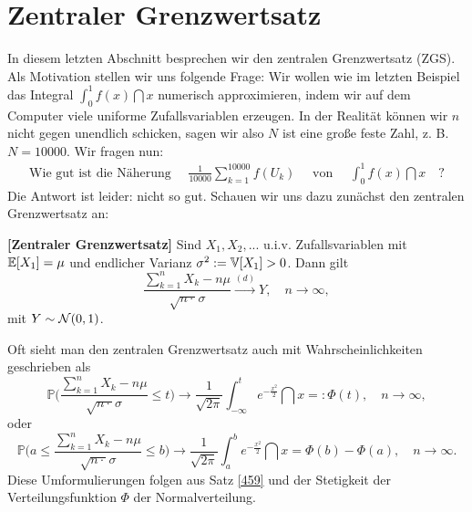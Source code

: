 \section{Zentraler Grenzwertsatz}
In diesem letzten Abschnitt besprechen wir den zentralen Grenzwertsatz (ZGS). Als Motivation stellen wir uns folgende Frage: Wir wollen wie im letzten Beispiel das Integral $\int_0^1 f(x)\dint x$ numerisch approximieren, indem wir auf dem Computer viele uniforme Zufallsvariablen erzeugen. In der Realit\"at k\"onnen wir $n$ nicht gegen unendlich schicken, sagen wir also $N$ ist eine gro\ss e feste Zahl, z. B. $N=10000$. Wir fragen nun:
\begin{align*}
	\text{Wie gut ist die N\"aherung $\quad \frac{1}{10000} \sum_{k=1}^{10000} f(U_k)\quad$ von $\quad\int_0^1 f(x)\dint x\quad$?} 
\end{align*}	
	Die Antwort ist leider: nicht so gut.  Schauen wir uns dazu zun\"achst den zentralen Grenzwertsatz an:
\begin{satz}\label{ZGS}
 \textbf{[Zentraler Grenzwertsatz]}
	Sind $X_1,X_2,...$ u.i.v. Zufallsvariablen mit $\mathbb{E}[X_1] = \mu$ und endlicher Varianz $\sigma^2:=\mathbb{V}[X_1]  > 0$. Dann gilt
		\label{ZGSEins} \[ \frac{\sum_{k = 1}^{n} X_k - n \mu}{\sqrt{n \cdot }\sigma} \overset{(d)}{\longrightarrow} Y, \quad n \to \infty, \]
		mit $Y \sim \mathcal{N}(0,1)$.
\end{satz}
Oft sieht man den zentralen Grenzwertsatz auch mit Wahrscheinlichkeiten geschrieben als
	 	 \[ \mathbb{P}\Big( \frac{\sum_{k=1}^{n}X_k - n \mu}{\sqrt{n \cdot }\sigma} \leq t\Big) \to \frac{1}{\sqrt{2 \pi}} \int_{-\infty}^{t} e^{-\frac{x^2}{2}} \dint x=: \Phi(t) ,\quad  n \to \infty,\]
oder
	 \[ \mathbb{P}\Big( a \leq \frac{\sum_{k=1}^{n}X_k - n \mu}{\sqrt{n \cdot }\sigma} \leq b \Big) \to \frac{1}{\sqrt{2 \pi}} \int_{a}^{b} e^{-\frac{x^2}{2}} \dint x=\Phi(b)-\Phi(a),\quad  n \to \infty.\]
	Diese Umformulierungen folgen aus Satz \ref{459} und der Stetigkeit der Verteilungsfunktion $\Phi$ der Normalverteilung.
